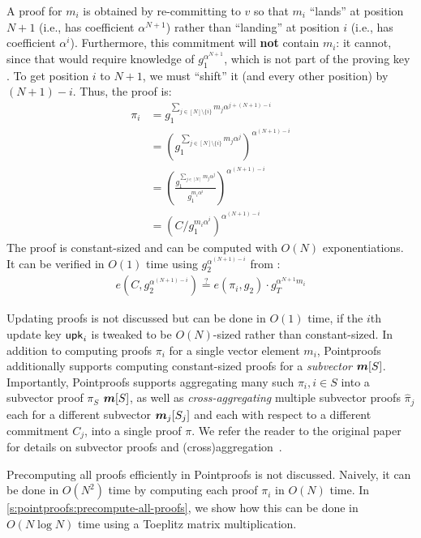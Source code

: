 A proof for $m_i$ is obtained by re-committing to $v$ so that $m_i$ ``lands'' at position $N+1$ (i.e., has coefficient $\alpha^{N+1}$) rather than ``landing'' at position $i$ (i.e., has coefficient $\alpha^i$).
Furthermore, this commitment will \textbf{not} contain $m_i$: it cannot, since that would require knowledge of $g_1^{\alpha^{N+1}}$, which is not part of the proving key \prk.
To get position $i$ to $N+1$, we must ``shift'' it (and every other position) by $(N + 1) - i$.
Thus, the proof is:
\begin{align}
    \label{eq:indiv-proof}
    \pi_i &= g_1^{\sum_{j\in[N]\setminus\{i\}} m_j \alpha^{j + (N+1) - i}}\\
    &= \left(g_1^{\sum_{j\in[N]\setminus\{i\}} m_j \alpha^{j}}\right)^{\alpha^{(N+1) - i}}\\
    &= \left(\frac{g_1^{\sum_{j\in[N]} m_j \alpha^{j}}}{g_1^{m_i \alpha^i}}\right)^{\alpha^{(N+1) - i}}\\
    &= (C / g_1^{m_i \alpha^i})^{\alpha^{(N+1) - i}}
\end{align}
The proof is constant-sized and can be computed with $O(N)$ exponentiations.
It can be verified in $O(1)$ time using $g_2^{\alpha^{(N+1) - i}}$ from \vrk:
\begin{align}
    e(C, g_2^{\alpha^{(N+1)-i}}) \stackrel{?}{=} e(\pi_i, g_2) \cdot g_T^{\alpha^{N+1} m_i}
\end{align}

Updating proofs is not discussed but can be done in $O(1)$ time, if the $i$th update key $\mathsf{upk}_i$ is tweaked to be $O(N)$-sized rather than constant-sized.
In addition to computing proofs $\pi_i$ for a single vector element $m_i$, Pointproofs additionally supports computing constant-sized proofs for a \textit{subvector} $\bm{m}[S]$.
Importantly, Pointproofs supports aggregating many such $\pi_i, i\in S$ into a subvector proof $\pi_S$ $\bm{m}[S]$, as well as \textit{cross-aggregating} multiple subvector proofs $\hat{\pi}_j$ each for a different subvector $\bm{m}_j[S_j]$ and each with respect to a different commitment $C_j$, into a single proof $\pi$.
We refer the reader to the original paper for details on subvector proofs and (cross)aggregation~\cite{GRWZ20}.

Precomputing all proofs efficiently in Pointproofs is not discussed.
Naively, it can be done in $O(N^2)$ time by computing each proof $\pi_i$ in $O(N)$ time.
In \cref{s:pointproofs:precompute-all-proofs}, we show how this can be done in $O(N\log{N})$ time using a Toeplitz matrix multiplication.
